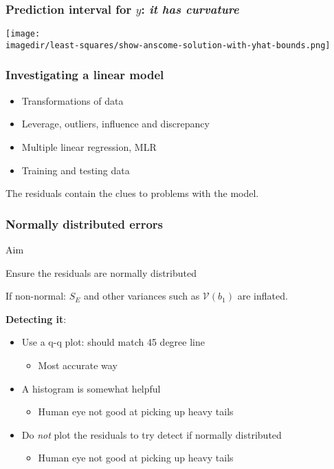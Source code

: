 \begin{frame}\frametitle{Prediction interval for $y$: \emph{it has curvature}}
	\begin{center}
		\texttt{[image: \\imagedir/least-squares/show-anscome-solution-with-yhat-bounds.png]}
	\end{center}
\end{frame}

\begin{frame}\frametitle{Investigating a linear model}
	\begin{itemize}
		\item	Transformations of data
		\item	Leverage, outliers, influence and discrepancy
		\item	Multiple linear regression, MLR
		\item	Training and testing data
	\end{itemize}

	\vspace{12pt}
	The residuals contain the clues to problems with the model.
\end{frame}

\begin{frame}\frametitle{Normally distributed errors}

	\begin{exampleblock}{Aim}
		\begin{center}
			Ensure the residuals are normally distributed
		\end{center}
	\end{exampleblock}

	If non-normal: $S_E$ and other variances such as $\mathcal{V}(b_1)$ are inflated.

	\vspace{12pt}
	\textbf{Detecting it}:
	\begin{itemize}
		\item	Use a q-q plot: should match 45 degree line
		\begin{itemize}
			\item	Most accurate way
		\end{itemize}
		\item	A histogram is somewhat helpful
		\begin{itemize}
			\item	Human eye not good at picking up heavy tails
		\end{itemize}
		\item	Do \emph{not} plot the residuals to try detect if normally distributed
		\begin{itemize}
			\item	Human eye not good at picking up heavy tails
		\end{itemize}
	\end{itemize}
\end{frame}

